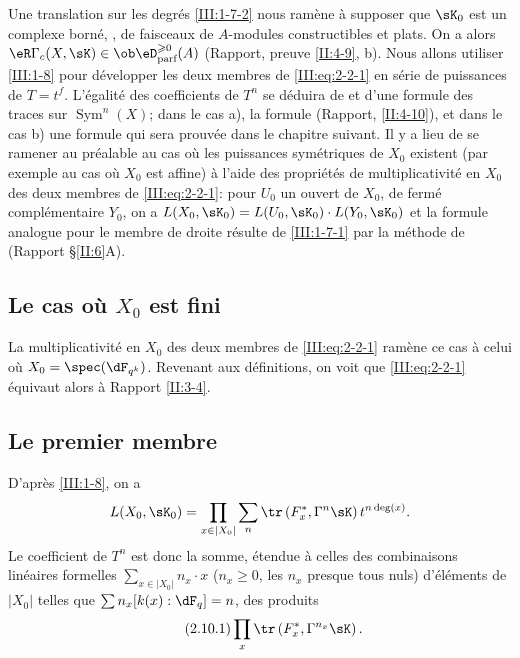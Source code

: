 Une translation sur les degrés \ref{III:1-7-2} nous ramène à supposer 
que $\sK_0$ est un complexe borné, , de faisceaux de 
$A$-modules constructibles et plats. On a alors 
$\eR\Gamma_c(X,\sK)\in \ob\eD_\text{parf}^{\geqslant 0}(A)$ (Rapport, 
preuve \ref{II:4-9}, b). Nous allons utiliser \ref{III:1-8} pour développer 
les deux membres de \eqref{III:eq:2-2-1} en série de puissances de $T=t^f$. 
L'égalité des coefficients de $T^n$ se déduira de 
\cite[XVII 5.5.21]{sga4} et d'une formule des traces sur 
$\operatorname{Sym}^n(X)$; dans le cas a), la formule (Rapport, 
\ref{II:4-10}), et dans le cas b) une formule qui sera prouvée dans le 
chapitre suivant. Il y a lieu de se ramener au préalable au cas où les 
puissances symétriques de $X_0$ existent (par exemple au cas où $X_0$ est 
affine) à l'aide des propriétés de multiplicativité en $X_0$ des deux 
membres de \eqref{III:eq:2-2-1}: pour $U_0$ un ouvert de $X_0$, de fermé 
complémentaire $Y_0$, on a $L(X_0,\sK_0)=L(U_0,\sK_0)\cdot L(Y_0,\sK_0)$ et 
la formule analogue pour le membre de droite résulte de \ref{III:1-7-1} 
par la méthode de (Rapport \S\ref{II:6}A). 





\subsection{Le cas où $X_0$ est fini}\label{III:2-9}

La multiplicativité en $X_0$ des deux membres de \eqref{III:eq:2-2-1} 
ramène ce cas à celui où $X_0=\spec(\dF_{q^k})$. Revenant aux 
définitions, on voit que \eqref{III:eq:2-2-1} équivaut alors à 
Rapport \ref{II:3-4}. 





\subsection{Le premier membre}\label{III:2-10}

D'après \ref{III:1-8}, on a 
\[
  L(X_0,\sK_0) = \prod_{x\in |X_0|} \sum_n \tr\left(F_x^*,\Gamma^n\sK\right) t^{n\deg(x)} \text{.}
\]
Le coefficient de $T^n$ est donc la somme, étendue à celles des 
combinaisons linéaires formelles $\sum_{x\in |X_0|} n_x\cdot x$ 
($n_x\geqslant 0$, les $n_x$ presque tous nuls) d'éléments de $|X_0|$ 
telles que $\sum n_x [k(x):\dF_q] = n$, des produits 
\begin{equation*}\tag{2.10.1}\label{III:eq:2-10-1}
  \prod_x \tr\left(F_x^*,\Gamma^{n_x} \sK\right) \text{.}
\end{equation*}

